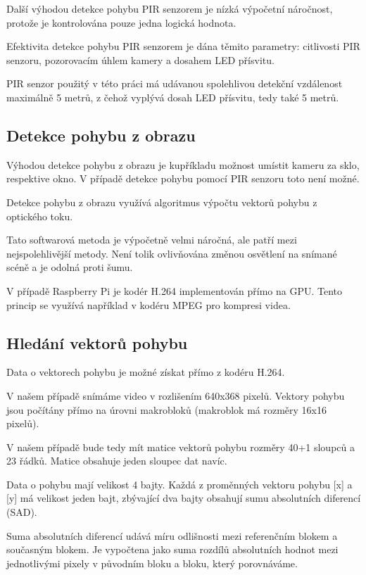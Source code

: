 Další výhodou detekce pohybu PIR senzorem je nízká výpočetní náročnost, protože je kontrolována pouze jedna logická hodnota. 

Efektivita detekce pohybu PIR senzorem je dána těmito parametry: citlivosti PIR senzoru, pozorovacím úhlem kamery a dosahem LED přísvitu.

PIR senzor použitý v této práci má udávanou spolehlivou detekční vzdálenost maximálně 5 metrů, z čehož vyplývá dosah LED přísvitu, tedy také 5 metrů.

\subsection*{Detekce pohybu z obrazu}
Výhodou detekce pohybu z obrazu je kupříkladu možnost umístit kameru za sklo, respektive okno. V případě detekce pohybu pomocí PIR senzoru toto není možné.

Detekce pohybu z obrazu využívá algoritmus výpočtu vektorů pohybu z optického toku.

Tato softwarová metoda je výpočetně velmi náročná, ale patří mezi nejspolehlivější metody. Není tolik ovlivňována změnou osvětlení na snímané scéně a je odolná proti šumu.

V případě Raspberry Pi je kodér H.264 implementován přímo na GPU. Tento princip se využívá například v kodéru MPEG pro kompresi videa.

\subsection*{Hledání vektorů pohybu}
Data o vektorech pohybu je možné získat přímo z kodéru H.264.

V našem případě snímáme video v rozlišením 640x368 pixelů. Vektory pohybu jsou počítány přímo na úrovni makrobloků (makroblok má rozměry 16x16 pixelů).

V našem případě bude tedy mít matice vektorů pohybu rozměry 40+1 sloupců a 23 řádků. Matice obsahuje jeden sloupec dat navíc.

Data o pohybu mají velikost 4 bajty. Každá z proměnných vektoru pohybu [x] a [y] má velikost jeden bajt, zbývající dva bajty obsahují sumu absolutních diferencí (SAD). 

Suma absolutních diferencí udává míru odlišnosti mezi referenčním blokem a současným blokem. Je vypočtena jako suma rozdílů absolutních hodnot mezi jednotlivými pixely v původním bloku a bloku, který porovnáváme. 

